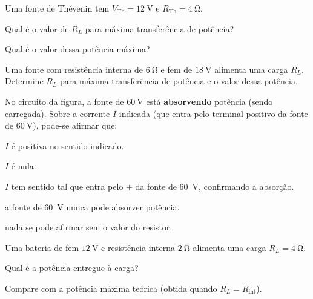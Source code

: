\blocoaplicacao
\begin{questao}[2]{}

Uma fonte de Thévenin tem $V_{\text{Th}} = \SI{12}{\volt}$ e
$R_{\text{Th}} = \SI{4}{\ohm}$.
\begin{itensq}
\item Qual é o valor de $R_L$ para máxima transferência de potência?
\item Qual é o valor dessa potência máxima?
\end{itensq}


\end{questao}
\begin{questao}[2]{}

Uma fonte com resistência interna de $\SI{6}{\ohm}$ e fem de $\SI{18}{\volt}$
alimenta uma carga $R_L$. Determine $R_L$ para máxima transferência de potência e
o valor dessa potência.


\end{questao}
\begin{questao}[2]{}

No circuito da figura, a fonte de $\SI{60}{\volt}$ está \textbf{absorvendo}
potência (sendo carregada). Sobre a corrente $I$ indicada (que entra pelo terminal
positivo da fonte de $\SI{60}{\volt}$), pode-se afirmar que:


\begin{alternativas}
\item $I$ é positiva no sentido indicado.
\item $I$ é nula.
\item $I$ tem sentido tal que entra pelo $+$ da fonte de \SI{60}{\volt},
      confirmando a absorção.
\item a fonte de \SI{60}{\volt} nunca pode absorver potência.
\item nada se pode afirmar sem o valor do resistor.
\end{alternativas}


\end{questao}
\begin{questao}[2]{}

Uma bateria de fem $\SI{12}{\volt}$ e resistência interna $\SI{2}{\ohm}$ alimenta
uma carga $R_L = \SI{4}{\ohm}$.
\begin{itensq}
\item Qual é a potência entregue à carga?
\item Compare com a potência máxima teórica (obtida quando $R_L = R_{\text{int}}$).
\end{itensq}


\end{questao}

